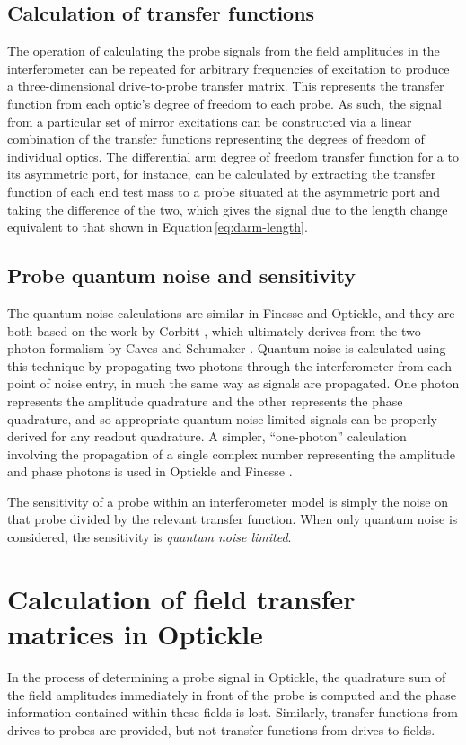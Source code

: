 \subsection{Calculation of transfer functions}
The operation of calculating the probe signals from the field amplitudes in the interferometer can be repeated for arbitrary frequencies of excitation to produce a three-dimensional drive-to-probe transfer matrix. This represents the transfer function from each optic's degree of freedom to each probe. As such, the signal from a particular set of mirror excitations can be constructed via a linear combination of the transfer functions representing the degrees of freedom of individual optics. The differential arm degree of freedom transfer function for a \MI{} to its asymmetric port, for instance, can be calculated by extracting the transfer function of each end test mass to a probe situated at the asymmetric port and taking the difference of the two, which gives the signal due to the length change equivalent to that shown in Equation\,\ref{eq:darm-length}.

\subsection{Probe quantum noise and sensitivity}
The quantum noise calculations are similar in Finesse and Optickle, and they are both based on the work by Corbitt \etal{} \cite{Corbitt2005}, which ultimately derives from the two-photon formalism by Caves and Schumaker \cite{Caves1985, Schumaker1985}. Quantum noise is calculated using this technique by propagating two photons through the interferometer from each point of noise entry, in much the same way as signals are propagated. One photon represents the amplitude quadrature and the other represents the phase quadrature, and so appropriate quantum noise limited signals can be properly derived for any readout quadrature. A simpler, ``one-photon'' calculation involving the propagation of a single complex number representing the amplitude and phase photons is used in Optickle and Finesse \cite{Evans2013, Brown2016}.

The sensitivity of a probe within an interferometer model is simply the noise on that probe divided by the relevant transfer function. When only quantum noise is considered, the sensitivity is \emph{quantum noise limited}.

\section{\label{sec:optickle-field-tfs}Calculation of field transfer matrices in Optickle}
In the process of determining a probe signal in Optickle, the quadrature sum of the field amplitudes immediately in front of the probe is computed and the phase information contained within these fields is lost. Similarly, transfer functions from drives to probes are provided, but not transfer functions from drives to fields.

